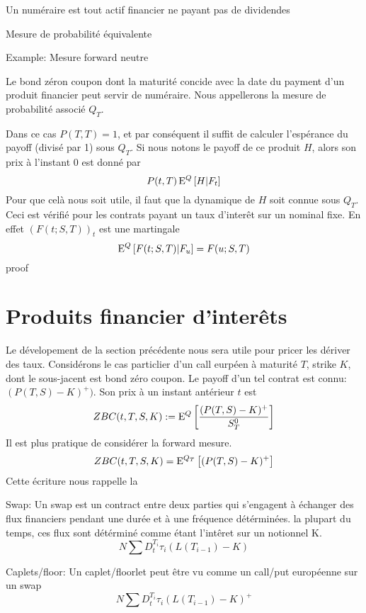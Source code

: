 \begin{defn} Un numéraire est tout actif financier ne payant pas de dividendes \end{defn}

\begin{defn} Mesure de probabilité équivalente


\end{defn}

Example: Mesure forward neutre

Le bond zéron coupon dont la maturité concide avec la date du payment d'un produit financier peut servir de numéraire. Nous appellerons la mesure de probabilité associé $Q_T$.

Dans ce cas $P(T, T) = 1$, et par conséquent il suffit de calculer l'espérance du payoff (divisé par 1) sous $Q_T$.
Si nous notons le payoff de ce produit $H$, alors son prix à l'instant $0$ est donné par $$P(t, T) \, \mathrm{E}^Q \left[  H | F_t  \right] $$
Pour que celà nous soit utile, il faut que la dynamique de $H$ soit connue sous $Q_T$. Ceci est vérifié pour les contrats payant un taux d'interêt sur un nominal fixe. En effet $(F(t; S, T))_t$ est une martingale 
$$ \mathrm{E}^Q \left[  F(t; S, T) | F_u  \right] = F(u; S, T)$$
proof



\newpage

\section{Produits financier d'interêts}

Le dévelopement de la section précédente nous sera utile pour pricer les dériver des taux.
Considérons le cas particlier d'un call eurpéen à maturité $T$, strike $K$, dont le sous-jacent est bond zéro coupon. Le payoff d'un tel contrat est connu: $ (P(T, S) - K)^+)$. Son prix à un instant antérieur $t$ est
$$ZBC(t, T, S, K) := \mathrm{E}^Q \left[  \frac{(P(T, S) - K)^+}{S^0_T}  \right]$$
Il est plus pratique de considérer la forward mesure. 
$$ZBC(t, T, S, K) = \mathrm{E}^{Q_T} \left[ (P(T, S) - K)^+ \right]$$
Cette écriture nous rappelle la 

\begin{defn}
  Swap:
Un swap est un contract entre deux parties qui s'engagent à échanger des flux financiers pendant une durée et à une fréquence détérminées. la plupart du temps, ces flux sont détérminé comme étant l'intêret sur un notionnel K. 
$$ N \sum D_t^{T_i} \tau_i (L(T_{i-1}) - K) $$
\end{defn}


\begin{defn}
  Caplets/floor:
Un caplet/floorlet peut être vu comme un call/put européenne sur un swap
$$ N \sum D_t^{T_i} \tau_i (L(T_{i-1}) - K)^+ $$
\end{defn}

